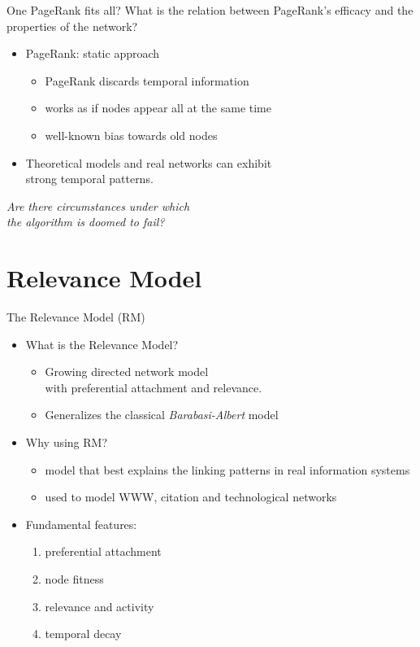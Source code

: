 \documentclass[utf8]{beamer}
\begin{document}
\begin{frame}{One PageRank fits all?}
    What is the relation between PageRank's efficacy and the properties of the network?
    \begin{itemize}
        \item PageRank: \alert{static} approach
        \begin{itemize}
            \item PageRank discards temporal information
            \item works as if nodes appear all at the same time
            \item well-known bias towards old nodes
        \end{itemize}
        \item Theoretical models and real networks can exhibit \\ \alert{strong temporal patterns}.
    \end{itemize}
    \begin{center}
        \emph{Are there circumstances under which \\ the algorithm is doomed to fail?}
    \end{center}
\end{frame}

\section{Relevance Model}
\begin{frame}{The Relevance Model (RM)}
    \begin{itemize}
        \item What is the Relevance Model?
        \begin{itemize}
            \item Growing directed network model \\ with \alert{preferential attachment} and \alert{relevance}.
            \item Generalizes the classical \emph{Barabasi-Albert} model
        \end{itemize}

        \item Why using RM?
        \begin{itemize}
            \item model that best explains the linking patterns in real information systems
            \item used to model WWW, citation and technological networks
        \end{itemize}

        \item Fundamental features:
        \begin{enumerate}
            \item preferential attachment
            \item node fitness
            \item relevance and activity
            \item temporal decay
        \end{enumerate}
    \end{itemize}
\end{frame}
\end{document}
